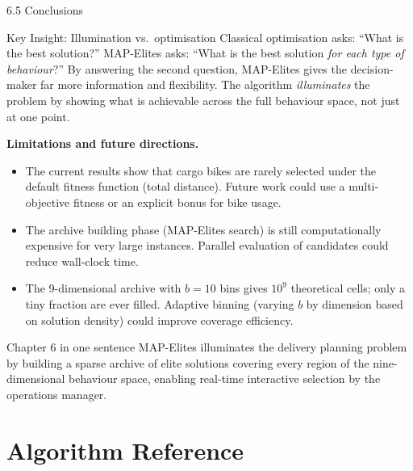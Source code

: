 \documentclass[aspectratio=169,10pt]{beamer}
\begin{document}
\begin{frame}[allowframebreaks]{6.5 Conclusions}
\framebreak

\begin{alertblock}{Key Insight: Illumination vs.\ optimisation}
Classical optimisation asks: ``What is the best solution?''
MAP-Elites asks: ``What is the best solution \emph{for each type of
behaviour}?''
By answering the second question, MAP-Elites gives the decision-maker
far more information and flexibility.
The algorithm \emph{illuminates} the problem by showing what is
achievable across the full behaviour space, not just at one point.
\end{alertblock}

\medskip
\textbf{Limitations and future directions.}
\begin{itemize}
  \item The current results show that cargo bikes are rarely selected
        under the default fitness function (total distance).
        Future work could use a multi-objective fitness or an explicit
        bonus for bike usage.
  \item The archive building phase (MAP-Elites search) is still
        computationally expensive for very large instances.
        Parallel evaluation of candidates could reduce wall-clock time.
  \item The 9-dimensional archive with $b=10$ bins gives $10^9$
        theoretical cells; only a tiny fraction are ever filled.
        Adaptive binning (varying $b$ by dimension based on solution
        density) could improve coverage efficiency.
\end{itemize}

\medskip
\begin{block}{Chapter 6 in one sentence}
MAP-Elites illuminates the delivery planning problem by building a
sparse archive of elite solutions covering every region of the
nine-dimensional behaviour space, enabling real-time interactive
selection by the operations manager.
\end{block}

\end{frame}

\section{Algorithm Reference}
\end{document}
